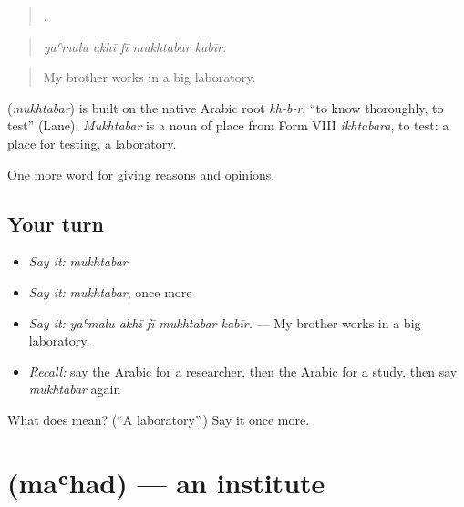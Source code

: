 \begin{quote}
    .
\end{quote}

\begin{quote}
\emph{yaʿmalu akhī fī mukhtabar kabīr.}
\end{quote}

\begin{quote}
My brother works in a big laboratory.
\end{quote}

\begin{cousinweb}
\textbf{} (\emph{mukhtabar}) is built on the native Arabic root \emph{kh-b-r}, \textquotedblleft{}to know thoroughly, to test\textquotedblright{} (Lane). \emph{Mukhtabar} is a noun of place from Form VIII \emph{ikhtabara}, to test: a place for testing, a laboratory.
\end{cousinweb}

\begin{grammarlens}[title={What you've built}]
One more word for giving reasons and opinions.
\end{grammarlens}

\subsection*{Your turn}
\begin{itemize}
\raggedright
  \item \emph{Say it:} \emph{mukhtabar}
  \item \emph{Say it:} \emph{mukhtabar}, once more
  \item \emph{Say it:} \emph{yaʿmalu akhī fī mukhtabar kabīr.} — My brother works in a big laboratory.
  \item \emph{Recall:} say the Arabic for a researcher, then the Arabic for a study, then say \emph{mukhtabar} again
\end{itemize}

\begin{tcolorbox}[breakable,colback=teal!4,colframe=teal!35!black,title={Before you move on}]
What does  mean? (\textquotedblleft{}A laboratory\textquotedblright{}.) Say it once more.
\end{tcolorbox}
\section[\texorpdfstring{\ar{معهد} (maʿhad)}{معهد (maʿhad)}]{ (maʿhad) — an institute}

